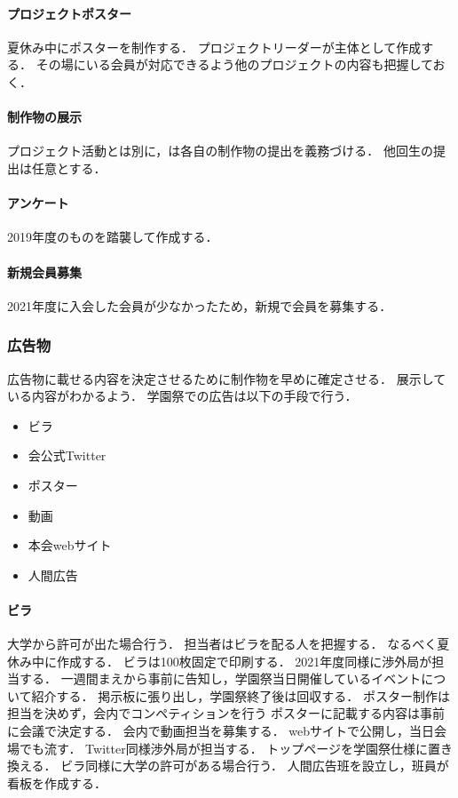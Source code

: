 \paragraph{プロジェクトポスター}
夏休み中にポスターを制作する．
プロジェクトリーダーが主体として作成する．
その場にいる会員が対応できるよう他のプロジェクトの内容も把握しておく．
\paragraph{制作物の展示}
プロジェクト活動とは別に\secondGrade{}，\thirdGrade{}は各自の制作物の提出を義務づける．
他回生の提出は任意とする．
\paragraph{アンケート}
2019年度のものを踏襲して作成する．
\paragraph{新規会員募集}
2021年度に入会した会員が少なかったため，新規で会員を募集する．
    
\subsubsection{広告物}
広告物に載せる内容を決定させるために制作物を早めに確定させる．
展示している内容がわかるよう．
学園祭での広告は以下の手段で行う．
\begin{itemize}
    \item ビラ
    \item 会公式Twitter
    \item ポスター
    \item 動画
    \item 本会webサイト
    \item 人間広告
\end{itemize}
\paragraph{ビラ}
大学から許可が出た場合行う．
担当者はビラを配る人を把握する．
なるべく夏休み中に作成する．
ビラは100枚固定で印刷する．
2021年度同様に渉外局が担当する．
一週間まえから事前に告知し，学園祭当日開催しているイベントについて紹介する．
掲示板に張り出し，学園祭終了後は回収する．
ポスター制作は担当を決めず，会内でコンペティションを行う
ポスターに記載する内容は事前に会議で決定する．
会内で動画担当を募集する．
webサイトで公開し，当日会場でも流す．
Twitter同様渉外局が担当する．
トップページを学園祭仕様に置き換える．
ビラ同様に大学の許可がある場合行う．
人間広告班を設立し，班員が看板を作成する．

